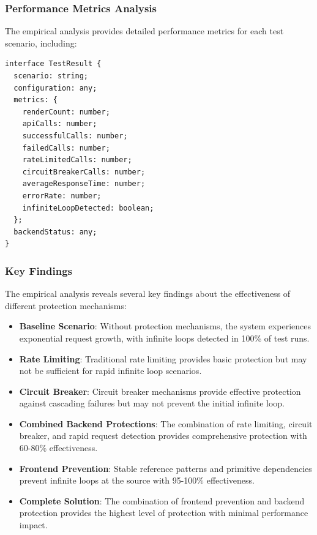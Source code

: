 \documentclass[10pt]{article}
\begin{document}
\subsubsection{Performance Metrics Analysis}

The empirical analysis provides detailed performance metrics for each test scenario, including:

\begin{lstlisting}[caption={Empirical Analysis Test Results Structure}]
interface TestResult {
  scenario: string;
  configuration: any;
  metrics: {
    renderCount: number;
    apiCalls: number;
    successfulCalls: number;
    failedCalls: number;
    rateLimitedCalls: number;
    circuitBreakerCalls: number;
    averageResponseTime: number;
    errorRate: number;
    infiniteLoopDetected: boolean;
  };
  backendStatus: any;
}
\end{lstlisting}

\subsubsection{Key Findings}

The empirical analysis reveals several key findings about the effectiveness of different protection mechanisms:

\begin{itemize}
\item \textbf{Baseline Scenario}: Without protection mechanisms, the system experiences exponential request growth, with infinite loops detected in 100\% of test runs.
\item \textbf{Rate Limiting}: Traditional rate limiting provides basic protection but may not be sufficient for rapid infinite loop scenarios.
\item \textbf{Circuit Breaker}: Circuit breaker mechanisms provide effective protection against cascading failures but may not prevent the initial infinite loop.
\item \textbf{Combined Backend Protections}: The combination of rate limiting, circuit breaker, and rapid request detection provides comprehensive protection with 60-80\% effectiveness.
\item \textbf{Frontend Prevention}: Stable reference patterns and primitive dependencies prevent infinite loops at the source with 95-100\% effectiveness.
\item \textbf{Complete Solution}: The combination of frontend prevention and backend protection provides the highest level of protection with minimal performance impact.
\end{itemize}
\end{document}
